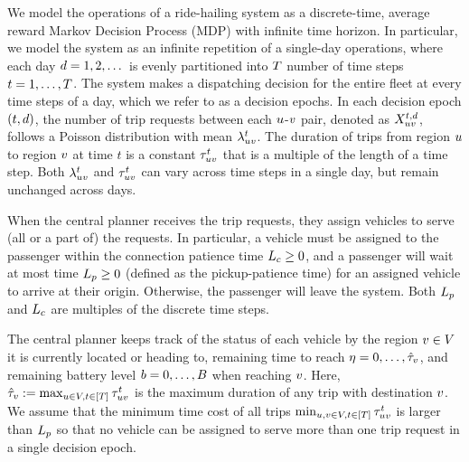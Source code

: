 We model the operations of a ride-hailing system as a discrete-time, average reward Markov Decision Process (MDP) with infinite time horizon. In particular, we model the system as an infinite repetition of a single-day operations, where each day $d =1, 2, \dots$ is evenly partitioned into $T$ number of time steps $t =1, \dots, T$. The system makes a dispatching decision for the entire fleet at every time steps of a day, which we refer to as a decision epochs. In each decision epoch $(t, d)$, the number of trip requests between each $u$-$v$ pair, denoted as $X_{uv}^{t, d}$, follows a Poisson distribution with mean $\lambda_{uv}^{t}$. The duration of trips from region $u$ to region $v$ at time $t$ is a constant $\tau_{uv}^{t}$ that is a multiple of the length of a time step. Both $\lambda_{uv}^{t}$ and $\tau_{uv}^{t}$ can vary across time steps in a single day, but remain unchanged across days.

When the central planner receives the trip requests, they assign vehicles to serve (all or a part of) the requests. In particular, a vehicle must be assigned to the passenger within the connection patience time $L_c \geq 0$, and a passenger will wait at most time $L_p \geq 0$ (defined as the pickup-patience time) for an assigned vehicle to arrive at their origin. Otherwise, the passenger will leave the system. Both $L_p$ and $L_c$ are multiples of the discrete time steps.



The central planner keeps track of the status of each vehicle by the region $v \in V$ it is currently located or heading to, remaining time to reach $\eta = 0, \dots, \hat{\tau}_{v}$, and remaining battery level $b =0, \dots, B$ when reaching $v$. Here, $\hat{\tau}_{v} : = \max_{u \in V, t \in [T]} \tau_{u v}^{t}$ is the maximum duration of any trip with destination $v$. We assume that the minimum time cost of all trips $\min_{u,v \in V, t \in [T]} \tau_{uv}^{t}$ is larger than $L_p$ so that no vehicle can be assigned to serve more than one trip request in a single decision epoch. 

